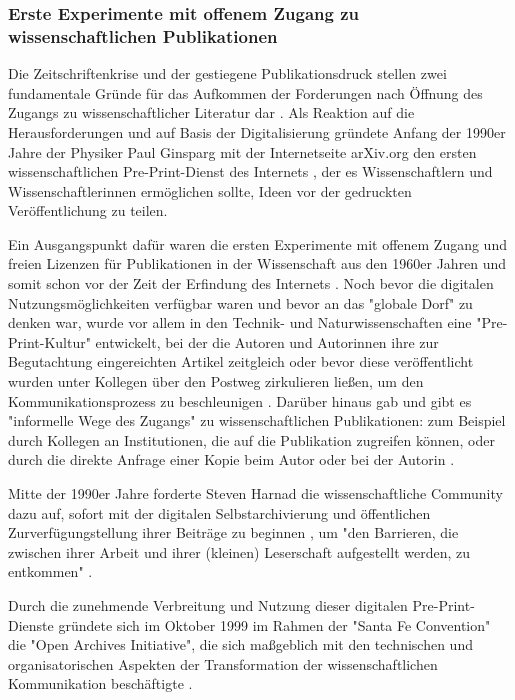 \subsubsection{Erste Experimente mit offenem Zugang zu wissenschaftlichen Publikationen}

Die Zeitschriftenkrise und der gestiegene Publikationsdruck stellen zwei fundamentale Gründe für das Aufkommen der Forderungen nach Öffnung des Zugangs zu wissenschaftlicher Literatur dar \cite{Brintzinger_2010} \cite{wein_2010_erwerbung}. Als Reaktion auf die Herausforderungen und auf Basis der Digitalisierung gründete Anfang der 1990er Jahre der Physiker Paul Ginsparg mit der Internetseite arXiv.org den ersten wissenschaftlichen Pre-Print-Dienst des Internets \cite{cite:5} \cite{bjork_2004_open}, der es Wissenschaftlern und Wissenschaftlerinnen ermöglichen sollte, Ideen vor der gedruckten Veröffentlichung zu teilen.

Ein Ausgangspunkt dafür waren die ersten Experimente mit offenem Zugang und freien Lizenzen für Publikationen in der Wissenschaft aus den 1960er Jahren und somit schon vor der Zeit der Erfindung des Internets \cite{cite:18b}. Noch bevor die digitalen Nutzungsmöglichkeiten verfügbar waren und bevor an das "globale Dorf" \cite{mcluhan_1962_gutenberg} zu denken war, wurde vor allem in den Technik- und Naturwissenschaften eine "Pre-Print-Kultur" entwickelt, bei der die Autoren und Autorinnen ihre zur Begutachtung eingereichten Artikel zeitgleich oder bevor diese veröffentlicht wurden unter Kollegen über den Postweg zirkulieren ließen, um den Kommunikationsprozess zu beschleunigen \cite[:6]{hofmann2015open}. Darüber hinaus gab und gibt es "informelle Wege des Zugangs" zu wissenschaftlichen Publikationen: zum Beispiel durch Kollegen an Institutionen, die auf die Publikation zugreifen können, oder durch die direkte Anfrage einer Kopie beim Autor oder bei der Autorin \cite{davis_2011_open}.

Mitte der 1990er Jahre forderte Steven Harnad die wissenschaftliche Community dazu auf, sofort mit der digitalen Selbstarchivierung und öffentlichen Zurverfügungstellung ihrer Beiträge zu beginnen \cite{albert_2006_open_implications}, um "den Barrieren, die zwischen ihrer Arbeit und ihrer (kleinen) Leserschaft aufgestellt werden, zu entkommen" \cite{harnad_1995_subversive_proposal}.

Durch die zunehmende Verbreitung und Nutzung dieser digitalen Pre-Print-Dienste gründete sich im Oktober 1999 im Rahmen der "Santa Fe Convention" die "Open Archives Initiative", die sich maßgeblich mit den technischen und organisatorischen Aspekten der Transformation der wissenschaftlichen Kommunikation beschäftigte \cite{van_2000_santa_fe}.

